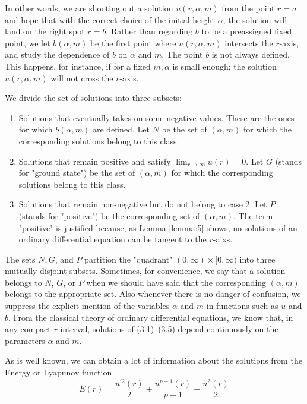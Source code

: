 In other words, we are shooting out a solution $u(r, \alpha, m)$ from the point $r=a$
and hope that with the correct choice of the initial height $\alpha$,
the solution will land on the right spot $r=b$.
Rather than regarding $b$ to be a preassigned fixed point,
we let $b(\alpha, m)$ be the first point where $u(r, \alpha, m)$ intersects the
$r$-axis, and study the dependence of $b$ on $\alpha$ and $m$.
The point $b$ is not always defined. This happens, for instance, 
if for a fixed $m, \alpha$ is small enough; the solution $u(r, \alpha, m)$ will 
not cross the $r$-axis.

We divide the set of solutions into three subsets:
\begin{enumerate}
  \item Solutions that eventually takes on some negative values.
    These are the ones for which $b(\alpha, m)$ are defined.
    Let $N$ be the set of $(\alpha, m)$ for which the corresponding
    solutions belong to this class.
  \item Solutions that remain positive and satisfy
    $\lim _{r \rightarrow \infty} u(r)=0$. Let $G$ (stands for "ground state")
    be the set of $(\alpha, m)$ for which the corresponding solutions
    belong to this class.
  \item Solutions that remain non-negative but do not belong to case 2.
    Let $P$ (stands for "positive") be the corresponding set of $(\alpha, m)$.
    The term "positive" is justified because, as Lemma \ref{lemma:5} shows,
    no solutions of an ordinary differential equation can be tangent to the $r$-aixs.
\end{enumerate}

The sets $N, G$, and $P$ partition the "quadrant" $(0, \infty) \times[0, \infty)$
into three
mutually disjoint subsets. Sometimes, for convenience,
we say that a solution belongs to $N$,
$G$, or $P$ when we should have said that the corresponding $(\alpha, m)$ belongs to the
appropriate set. Also whenever there is no danger of confusion, we suppress the explicit
mention of the variables $\alpha$ and $m$ in functions such as $u$ and $b$.
From the classical theory of ordinary differential equations, we know that,
in any compact $r$-interval, solutions
of (3.1)--(3.5) depend continuously on the parameters $\alpha$ and $m$.

As is well known, we can obtain a lot of information about the solutions
from the Energy or Lyapunov function
\begin{equation}\label{eq:3.6}
  E(r)=\frac{u^{\prime 2}(r)}{2}+\frac{u^{p+1}(r)}{p+1}-\frac{u^2(r)}{2}  
\end{equation}

